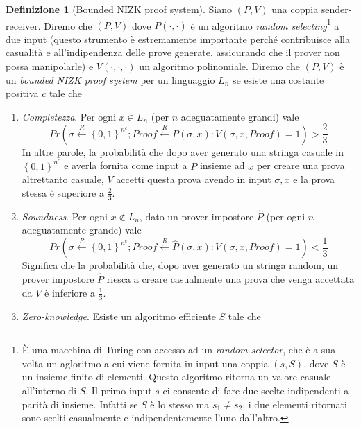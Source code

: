 \documentclass{article}
\theoremstyle{definition}
\newtheorem{definizione}{Definizione}
\begin{document}
\begin{definizione}[Bounded NIZK proof system] 
    Siano $(P, V)$ una coppia sender-receiver. Diremo che $(P, V)$ dove $P(\cdot,\cdot)$ è un algoritmo \emph{random selecting}\footnote{È una macchina di Turing con accesso ad un \emph{random selector}, che è a sua volta un agloritmo a cui viene fornita in input una coppia $(s, S)$, dove $S$ è un insieme finito di elementi. Questo algoritmo ritorna un valore casuale all'interno di $S$. Il primo input $s$ ci consente di fare due scelte indipendenti a parità di insieme. Infatti se $S$ è lo stesso ma $s_1 \neq s_2$, i due elementi ritornati sono scelti casualmente e indipendentemente l'uno dall'altro.} a due input (questo strumento è estremamente importante perché contribuisce alla casualità e all'indipendenza delle prove generate, assicurando che il prover non possa manipolarle) e $V(\cdot, \cdot, \cdot)$ un algoritmo polinomiale. Diremo che $(P, V)$ è un \emph{bounded NIZK proof system} per un linguaggio $L_n$ se esiste una costante positiva $c$ tale che
    \begin{enumerate}
        \item \emph{Completezza}. Per ogni $x \in L_n$ (per $n$ adeguatamente grandi) vale
        \begin{equation*}
            Pr\left(\sigma \overset{R}{\leftarrow} \left\{ 0, 1\right\}^{n^c}; Proof \overset{R}{\leftarrow} P(\sigma, x) : V(\sigma, x, Proof) = 1\right) > \frac{2}{3}
        \end{equation*}
        In altre parole, la probabilità che dopo aver generato una stringa casuale in $\left\{ 0, 1\right\}^{n^c}$ e averla fornita come input a $P$ insieme ad $x$ per creare una prova altrettanto casuale, $V$ accetti questa prova avendo in input $\sigma, x$ e la prova stessa è superiore a $\frac{2}{3}$.
        \item \emph{Soundness}. Per ogni $x \notin L_n$, dato un prover impostore $\hat{P}$ 
        (per ogni $n$ adeguatamente grande) vale
        \begin{equation*}
            Pr(\sigma \overset{R}{\leftarrow} \left\{ 0, 1\right\}^{n^c}; Proof \overset{R}{\leftarrow} \hat{P}(\sigma, x) : V(\sigma, x, Proof) = 1) < \frac{1}{3}
        \end{equation*}
        Significa che la probabilità che, dopo aver generato un stringa random, un prover impostore $\hat{P}$ riesca a creare casualmente una prova che venga accettata da $V$ è inferiore a $\frac{1}{3}$.
        \item \emph{Zero-knowledge}. Esiste un algoritmo efficiente $S$ tale che 

\end{enumerate}
\end{definizione}
\end{document}
